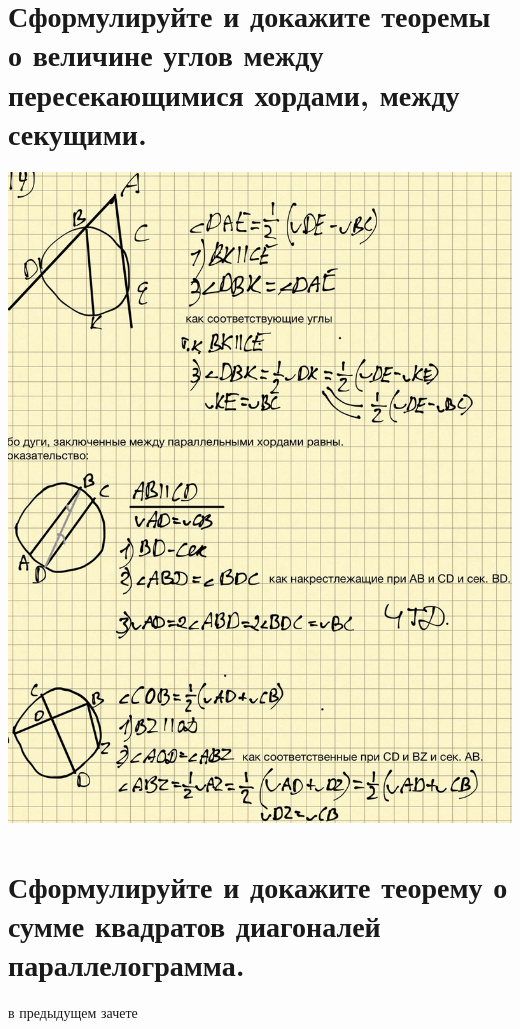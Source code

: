 \documentclass[12pt, letterpaper]{article}
\begin{document}
\section {Сформулируйте и докажите теоремы о величине углов между пересекающимися хордами, между секущими.}
\includegraphics[scale=0.3]{asset.jpg} \\


\section {Сформулируйте и докажите теорему о сумме квадратов диагоналей параллелограмма.}
в предыдущем зачете
\end{document}
